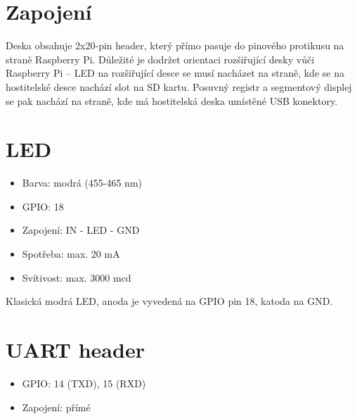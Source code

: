 \documentclass{article}
\newcommand\lang[2]{#1}
\begin{document}
\newpage

\section{\lang{Zapojení}{Connection}}

\lang{Deska obsahuje 2x20-pin header, který přímo pasuje do pinového protikusu na straně Raspberry Pi. Důležité je dodržet orientaci rozšiřující desky vůči Raspberry Pi -- LED na rozšiřující desce se musí nacházet na straně, kde se na hostitelské desce nachází slot na SD kartu. Posuvný registr a segmentový displej se pak nachází na straně, kde má hostitelská deska umístěné USB konektory.
}
{
The board contains 2x20-pin F header, which is intended to be directly connected to M header on the Raspberry Pi side. It is important to rotate the board correctly -- LED on the expansion board must be on the same side, as the SD card slot on the host board. The shift register and segment display is then localized on the same side, as USB ports on the host board.
}

\section{LED}

\begin{itemize}
	\item \lang{Barva: modrá}{Color: blue} (455-465 nm)
	\item GPIO: 18
	\item \lang{Zapojení}{Wiring}: IN - LED - GND
	\item \lang{Spotřeba}{Current}: max. 20 mA
	\item \lang{Svítivost}{Luminosity}: max. 3000 mcd
\end{itemize}

\lang{Klasická modrá LED, anoda je vyvedená na GPIO pin 18, katoda na GND.}{Standard blue LED, anode is connected to GPIO 18, cathode is connected to GND.}

\section{UART header}

\begin{itemize}
	\item GPIO: 14 (TXD), 15 (RXD)
	\item \lang{Zapojení: přímé}{Wiring: direct}
\end{itemize}
\end{document}
